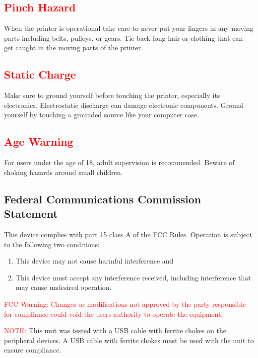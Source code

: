 \subsection{\textcolor{red}{Pinch Hazard}}

When the printer is operational take care to never put your fingers in any moving parts including belts, pulleys, or gears. Tie back long hair or clothing that can get caught in the moving parts of the printer.

\subsection{\textcolor{red}{Static Charge}}
Make sure to ground yourself before touching the printer, especially its electronics. Electrostatic discharge can damage electronic components. Ground yourself by touching a grounded source like your computer case.

\subsection{\textcolor{red}{Age Warning}}

For users under the age of 18, adult supervision is recommended. Beware of choking hazards around small children.

\subsection{Federal Communications Commission Statement}
This device complies with part 15 class A of the FCC Rules. Operation is subject to the following two conditions:
\begin{enumerate}
\item This device may not cause harmful interference and
\item This device must accept any interference received, including interference that may cause undesired operation.
\end{enumerate}

\textcolor{red}{FCC Warning:}
\textcolor{red}{Changes or modifications not approved by the party responsible for compliance could void the users authority to operate the equipment.}

\textcolor{red}{NOTE:} This unit was tested with a USB cable with ferrite chokes on the peripheral devices. A USB cable with ferrite chokes must be used with the unit to ensure compliance.

